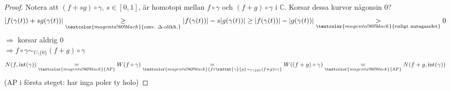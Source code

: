 \begin{proof}
Notera att $(f + sg) \circ \gamma$, $s \in [0, 1]$, är homotopi mellan $f \circ \gamma$ och $(f + g) \circ \gamma$ i $\mathbb{C}$. Korsar dessa kurvor någonsin $0$?
\[ |f(\gamma(t)) + sg(\gamma(t))| \underset{\textcolor{magenta!80!black}{\text{omv.\ }\Delta\text{-olikh.}}}{\ge} |f(\gamma(t))| - s|g(\gamma(t))| \ge |f(\gamma(t))| - |g(\gamma(t))| \underset{\textcolor{magenta!80!black}{\text{enligt antagandet}}}{>} 0 \]
$\Rightarrow$ korsar aldrig $0$\\
$\Rightarrow f \circ \gamma \sim_{\mathbb{C} \setminus \{0\}} (f + g) \circ \gamma$
\[ N(f, \operatorname{int}(\gamma)) \underset{\textcolor{magenta!80!black}{\text{AP}}}{=} W(f \circ \gamma) \underset{\textcolor{magenta!80!black}{f \circ \rattat{\gamma}{g} \sim_{\mathbb{C} \setminus \{0\}} (f + g) \circ \gamma}}{=} W((f + g) \circ \gamma) \underset{\textcolor{magenta!80!black}{\text{AP}}}{=} N(f + g, \operatorname{int}(\gamma)) \]
\textcolor{magenta!80!black}{(AP i första steget: har inga poler ty holo)}
\end{proof}
